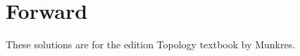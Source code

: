 \documentclass[titlepage]{book}
\begin{document}
\maketitle

\frontmatter
\tableofcontents

\chapter*{Forward}

These solutions are for the  edition Topology textbook by Munkres.

\mainmatter

\end{document}
